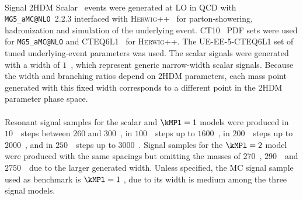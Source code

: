 \paragraph{}
Signal 2HDM Scalar \tohhb\ events were generated at LO in QCD with \texttt{MG5\_aMC@NLO}~2.2.3 interfaced with \textsc{Herwig++}~\cite{Bahr:2008pv} for parton-showering, hadronization and simulation of the underlying event. CT10~\cite{Lai:2010vv} PDF sets were used for \texttt{MG5\_aMC@NLO} and CTEQ6L1~\cite{cteq6l1} for \textsc{Herwig++}.
The UE-EE-5-CTEQ6L1 set of tuned underlying-event parameters \cite{Seymour:2013qka} was used. 
The scalar signals were generated with a width of $1$~\GeV, which represent generic narrow-width scalar signals. 
Because the width and branching ratios depend on 2HDM parameters, each mass point generated with this fixed width corresponds to a different point in the 2HDM parameter phase space.


\paragraph{}
Resonant signal samples for the scalar and $\kMPl=1$ models were produced in $10$~\GeV\ steps between $260$ and $300$~\GeV, in $100$~\GeV\ steps up to $1600$~\GeV, in $200$~\GeV\ steps up to $2000$~\GeV, and in $250$~\GeV\ steps up to $3000$~\GeV. Signal samples for the $\kMPl=2$ model were produced with the same spacings but omitting the masses of $270$~\GeV, $290$~\GeV\ and $2750$~\GeV\ due to the larger generated width. Unless specified, the MC signal sample used as benchmark is $\kMPl=1$ \Grav, due to its width is medium among the three signal models.













